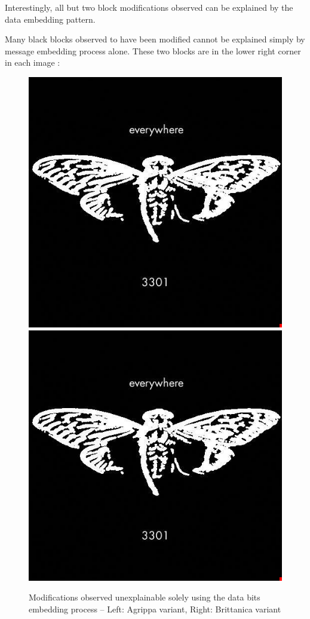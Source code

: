 \documentclass{article}
\begin{document}
Interestingly, all but two block modifications observed can be explained by the data embedding pattern.

Many black blocks observed to have been modified cannot be explained simply by message embedding process alone. These two blocks are in the lower right corner in each image :

\begin{figure}[h]
	\centering
	
	\includegraphics[scale=0.3]{agrippa_non_embedding_changes}
	\includegraphics[scale=0.3]{brittanica_non_embedding_changes}
	
	\caption{Modifications observed unexplainable solely using the data bits embedding process -- Left: Agrippa variant, Right: Brittanica variant}
\end{figure}
\end{document}
